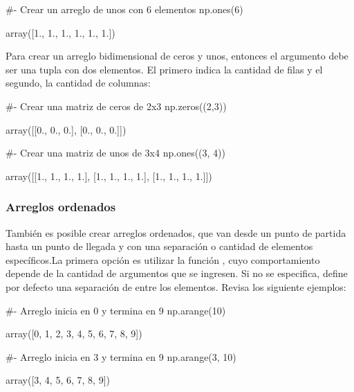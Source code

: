 \begin{pyin}[]
#- Crear un arreglo de unos con 6 elementos
np.ones(6)
\end{pyin}
\begin{pyout}
array([1., 1., 1., 1., 1., 1.])
\end{pyout}

Para crear un arreglo bidimensional de ceros y unos, entonces el argumento debe ser una tupla con dos elementos. El primero indica la cantidad de filas y el segundo, la cantidad de columnas:

\begin{pyin}[]
#- Crear una matriz de ceros de 2x3
np.zeros((2,3))
\end{pyin}
\begin{pyout}
array([[0., 0., 0.],
       [0., 0., 0.]])
\end{pyout}

\begin{pyin}[]
#- Crear una matriz de unos de 3x4
np.ones((3, 4))
\end{pyin}
\begin{pyout}
array([[1., 1., 1., 1.],
       [1., 1., 1., 1.],
       [1., 1., 1., 1.]])
\end{pyout}

\subsubsection{Arreglos ordenados}
También es posible crear arreglos ordenados, que van desde un punto de partida hasta un punto de llegada y con una separación o cantidad de elementos específicos.La primera opción es utilizar la función , cuyo comportamiento depende de la cantidad de argumentos que se ingresen. Si no se especifica,  define por defecto una separación de  entre los elementos. Revisa los siguiente ejemplos:

\begin{pyin}[]
#- Arreglo inicia en 0 y termina en 9
np.arange(10)
\end{pyin}
\begin{pyout}
array([0, 1, 2, 3, 4, 5, 6, 7, 8, 9])
\end{pyout}

\begin{pyin}[]
#- Arreglo inicia en 3 y termina en 9
np.arange(3, 10)
\end{pyin}
\begin{pyout}
array([3, 4, 5, 6, 7, 8, 9])
\end{pyout}

